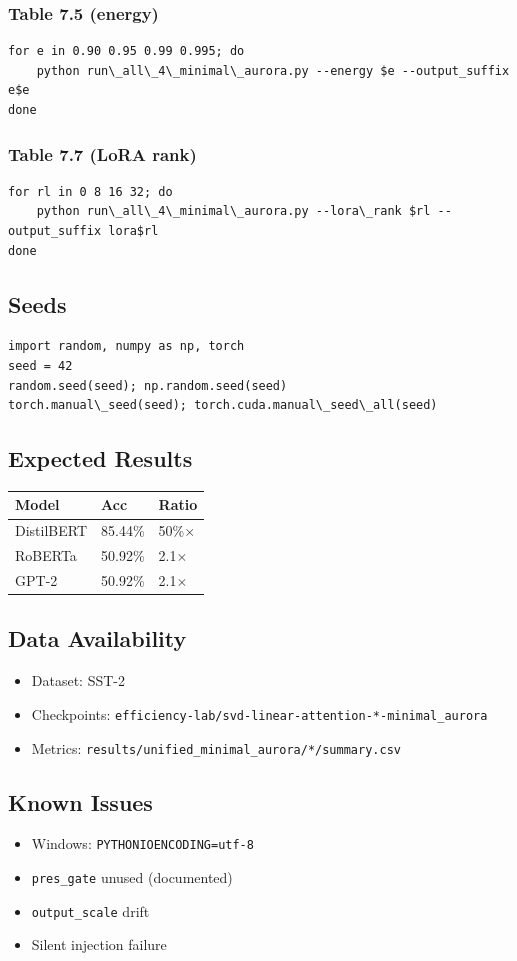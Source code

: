 \subsubsection{Table 7.5 (energy)}
\begin{lstlisting}
for e in 0.90 0.95 0.99 0.995; do
    python run\_all\_4\_minimal\_aurora.py --energy $e --output_suffix e$e
done
\end{lstlisting}

\subsubsection{Table 7.7 (LoRA rank)}
\begin{lstlisting}
for rl in 0 8 16 32; do
    python run\_all\_4\_minimal\_aurora.py --lora\_rank $rl --output_suffix lora$rl
done
\end{lstlisting}

\subsection{Seeds}

\begin{lstlisting}
import random, numpy as np, torch
seed = 42
random.seed(seed); np.random.seed(seed)
torch.manual\_seed(seed); torch.cuda.manual\_seed\_all(seed)
\end{lstlisting}

\subsection{Expected Results}

\begin{table}[H]
\centering
\small
\begin{tabular}{lll}
\toprule
\textbf{Model} & \textbf{Acc} & \textbf{Ratio} \\
\midrule
DistilBERT & 85.44\% & 50\%$\times$ \\
RoBERTa & 50.92\% & 2.1$\times$ \\
GPT-2 & 50.92\% & 2.1$\times$ \\
\bottomrule
\end{tabular}
\end{table}

\subsection{Data Availability}

\begin{itemize}
\item Dataset: SST-2
\item Checkpoints: \texttt{efficiency-lab/svd-linear-attention-*-minimal\_aurora}
\item Metrics: \texttt{results/unified\_minimal\_aurora/*/summary.csv}

\end{itemize}
\subsection{Known Issues}

\begin{itemize}
\item Windows: \texttt{PYTHONIOENCODING=utf-8}
\item \texttt{pres\_gate} unused (documented)
\item \texttt{output\_scale} drift
\item Silent injection failure

\end{itemize}
